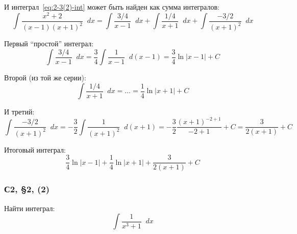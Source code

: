 \documentclass[a4paper,12pt]{article}
\newcommand{\diff}{\mathop{}\!d}
\begin{document}
\begin{solution}
    И интеграл~\eqref{eq:2-3(2)-int} может быть найден как сумма интегралов:
    \[
      \int \frac{x^2 + 2}{(x - 1) (x + 1)^2} \diff x
        = \int \frac{3/4}{x - 1} \diff x
        + \int \frac{1/4}{x + 1} \diff x
        + \int \frac{-3/2}{(x + 1)^2} \diff x
    \]

    Первый ``простой'' интеграл:
    \[
      \int \frac{3/4}{x - 1} \diff x = \frac{3}{4} \int \frac{1}{x - 1} \diff(x - 1) = \frac{3}{4} \ln|x - 1| + C
    \]

    Второй (из той же серии):
    \[
      \int \frac{1/4}{x + 1} \diff x = \ldots = \frac{1}{4} \ln|x + 1| + C
    \]


    И третий:
    \[
      \int \frac{-3/2}{(x + 1)^2} \diff x = -\frac{3}{2} \int \frac{1}{(x + 1)^2} \diff (x + 1) = -\frac{3}{2} \frac{(x + 1)^{-2 + 1}}{-2 + 1} + C = \frac{3}{2(x + 1)} + C
    \]

    Итоговый интеграл:
    \[
      \frac{3}{4} \ln|x - 1| + \frac{1}{4} \ln|x + 1| + \frac{3}{2(x + 1)} + C
    \]
  \end{solution}


  \subsubsection{С2, \S 2, (2)}

  Найти интеграл:
  \[
    \int \frac{1}{x^3 + 1} \diff x
  \]
\end{document}
